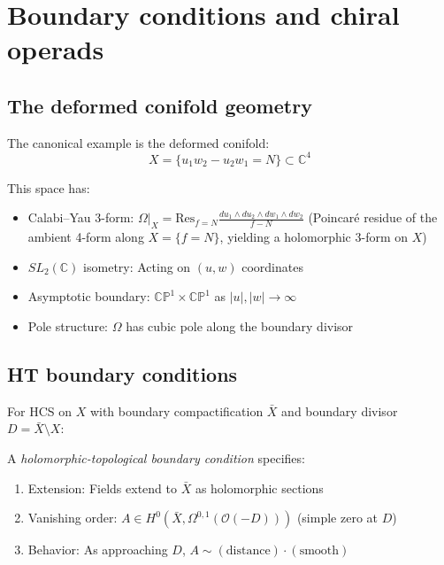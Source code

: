 \section{Boundary conditions and chiral operads}

\subsection{The deformed conifold geometry}

\begin{example}
The canonical example is the deformed conifold:
\[X = \{u_1 w_2 - u_2 w_1 = N\} \subset \mathbb{C}^4\]

This space has:
\begin{itemize}
\item Calabi--Yau 3-form: $\Omega|_X = \mathrm{Res}_{f=N}\frac{du_1 \wedge du_2 \wedge dw_1
\wedge dw_2}{f - N}$ (Poincar\'e residue of the ambient 4-form along $X = \{f = N\}$, yielding a holomorphic 3-form on $X$)
\item $SL_2(\mathbb{C})$ isometry: Acting on $(u, w)$ coordinates
\item Asymptotic boundary: $\mathbb{CP}^1 \times \mathbb{CP}^1$ as $|u|, |w| 
\to \infty$
\item Pole structure: $\Omega$ has cubic pole along the boundary divisor
\end{itemize}
\end{example}


\subsection{HT boundary conditions}

\begin{definition}
For HCS on $X$ with boundary compactification $\bar{X}$ and boundary divisor 
$D = \bar{X} \setminus X$:

A \emph{holomorphic-topological boundary condition} specifies:
\begin{enumerate}
\item Extension: Fields extend to $\bar{X}$ as holomorphic sections
\item Vanishing order: $A \in H^0(\bar{X}, \Omega^{0,1}(\mathcal{O}(-D)))$ (simple zero at $D$)
\item Behavior: As approaching $D$, $A \sim (\text{distance}) \cdot (\text{smooth})$
\end{enumerate}
\end{definition}

